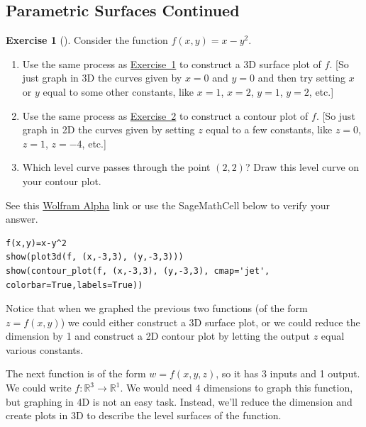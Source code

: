 \documentclass[10pt,]{book}
\theoremstyle{plain}
\theoremstyle{definition}
\theoremstyle{definition}
\theoremstyle{definition}
\theoremstyle{definition}
\newtheorem{exploration}[project]{Exercise}
\theoremstyle{definition}
\numberwithin{equation}{section}
\begin{document}
\subsection[{Parametric Surfaces Continued}]{Parametric Surfaces Continued}\label{subsection-27}
\begin{exploration}[]\label{exploration-112}
Consider the function \(f(x,y)=x-y^2\).%
\begin{enumerate}[font=\bfseries,label=(\alph*),ref=\alph*]
\item\label{task-216} Use the same process as \hyperref[prob_3dsurface_plot]{Exercise~1} to construct a 3D surface plot of \(f\). [So just graph in 3D the curves given by \(x=0\) and \(y=0\) and then try setting \(x\) or \(y\) equal to some other constants, like \(x=1\), \(x=2\), \(y=1\), \(y=2\), etc.]%
\item\label{task-217} Use the same process as \hyperref[prob_intro_to_contour_plots]{Exercise~2} to construct a contour plot of \(f\). [So just graph in 2D the curves given by setting \(z\) equal to a few constants, like \(z=0\), \(z=1\), \(z=-4\), etc.]%
\item\label{task-218} Which level curve passes through the point \((2,2)\)?  Draw this level curve on your contour plot.%
\end{enumerate}
\bigbreak
See this \href{http://wolfr.am/wBOk1b}{Wolfram Alpha} link or use the SageMathCell below to verify your answer.%
\begin{lstlisting}[style=sageinput]
f(x,y)=x-y^2
show(plot3d(f, (x,-3,3), (y,-3,3)))
show(contour_plot(f, (x,-3,3), (y,-3,3), cmap='jet', colorbar=True,labels=True))
\end{lstlisting}
\end{exploration}
Notice that when we graphed the previous two functions (of the form \(z=f(x,y)\)) we could either construct a 3D surface plot, or we could reduce the dimension by 1 and construct a 2D contour plot by letting the output \(z\) equal various constants.%
\par
The next function is of the form \(w=f(x,y,z)\), so it has 3 inputs and 1 output. We could write \(f\colon \mathbb{R}^3\to\mathbb{R}^1\). We would need 4 dimensions to graph this function, but graphing in 4D is not an easy task. Instead, we'll reduce the dimension and create plots in 3D to describe the level surfaces of the function.%
\end{document}
